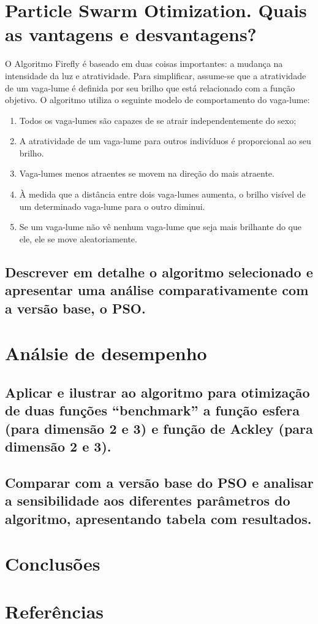\documentclass[10pt]{article}
\begin{document}
  \section{Particle Swarm Otimization. Quais as vantagens e desvantagens?}\label{sec:swarm-oti}
  O Algoritmo Firefly é baseado em duas coisas importantes: a mudança na intensidade da luz e atratividade. Para simplificar, 
  assume-se que a atratividade de um vaga-lume é definida por seu brilho que está relacionado com a função objetivo.
  O algoritmo utiliza o seguinte modelo de comportamento do vaga-lume: 
\begin{enumerate}
  \item Todos os vaga-lumes são capazes de se atrair independentemente do sexo; 
  \item A atratividade de um vaga-lume para outros indivíduos é proporcional ao seu brilho. 
  \item Vaga-lumes menos atraentes se movem na direção do mais atraente. 
  \item À medida que a distância entre dois vaga-lumes aumenta, o brilho visível de um determinado vaga-lume para o outro diminui. 
  \item Se um vaga-lume não vê nenhum vaga-lume que seja mais brilhante do que ele, ele se move aleatoriamente. 
\end{enumerate}
\subsection{Descrever em detalhe o algoritmo selecionado e apresentar uma análise comparativamente com a versão base, o PSO.  }\label{sec:desc-algo}

\section{Análsie de desempenho}\label{sec:an-do-desem}
\subsection{Aplicar e ilustrar ao algoritmo para otimização de duas funções “benchmark” a função esfera (para dimensão 2 e 3) e função de Ackley (para dimensão 2 e 3). }\label{sec:apre-da-org}
\subsection{Comparar com a versão base do PSO e analisar a sensibilidade aos diferentes parâmetros do algoritmo, apresentando tabela 
            com resultados.}\label{sec:comp-PSO}

\section{Conclusões}\label{sec:an-da-info-fin-da-org}

\vspace{1cm}

\section{Referências}\label{sec:sup-inf-utl}






\pagebreak
\end{document}
